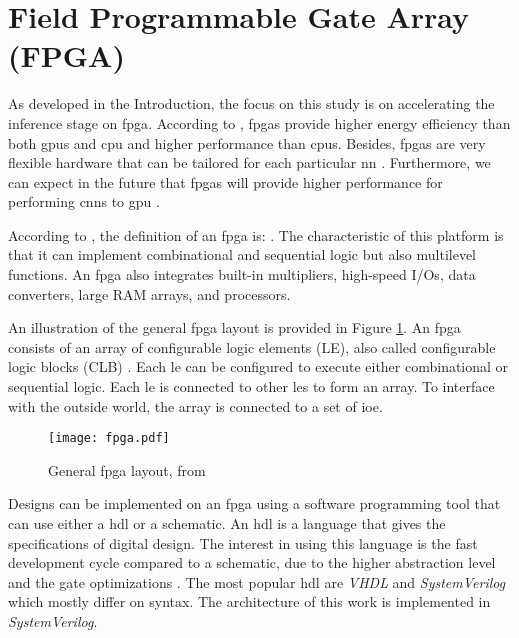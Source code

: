 \section{Field Programmable Gate Array (FPGA)} \label{sec:fpga}
%
%
As developed in the Introduction, the focus on this study is on accelerating the inference stage on \acrshort{fpga}. According to \textcite{mittal_survey_2015}, \acrshort{fpga}s provide higher energy efficiency than both \acrshort{gpu}s and \acrshort{cpu} and higher performance than \acrshort{cpu}s. Besides, \acrshort{fpga}s are very flexible hardware that can be tailored for each particular \acrshort{nn} \cite{vestias_fast_2019}. Furthermore, we can expect in the future that \acrshort{fpga}s will provide higher performance for performing \acrshort{cnn}s to \acrshort{gpu} \cite{nurvitadhi_can_2017}.

According to \textcite{harris_digital_2015}, the definition of an \acrshort{fpga} is: . The characteristic of this platform is that it can implement combinational and sequential logic but also multilevel functions. An \acrshort{fpga} also integrates built-in multipliers, high-speed I/Os, data converters, large RAM arrays, and processors.

An illustration of the general \acrshort{fpga} layout is provided in Figure \ref{fig:fpga}. An \acrshort{fpga} consists of an array of configurable logic elements (LE), also called configurable logic blocks (CLB) \cite{harris_digital_2015}. Each \acrshort{le} can be configured to execute either combinational or sequential logic. Each \acrshort{le} is connected to other \acrshort{le}s to form an array. To interface with the outside world, the array is connected to a set of \acrfull{ioe}.
%
\begin{figure}[H]
    \centering
    \texttt{[image: fpga.pdf]}
    \caption{General \acrshort{fpga} layout, from \cite{harris_digital_2015}}
    \label{fig:fpga}
\end{figure}

Designs can be implemented on an \acrshort{fpga} using a software programming tool that can use either a \acrfull{hdl} or a schematic. An \acrshort{hdl} is a language that gives the specifications of digital design. The interest in using this language is the fast development cycle compared to a schematic, due to the higher abstraction level and the gate optimizations \cite{harris_digital_2015}. The most popular \acrshort{hdl} are \textit{VHDL} and \textit{SystemVerilog} which mostly differ on syntax. The architecture of this work is implemented in \textit{SystemVerilog}. 

